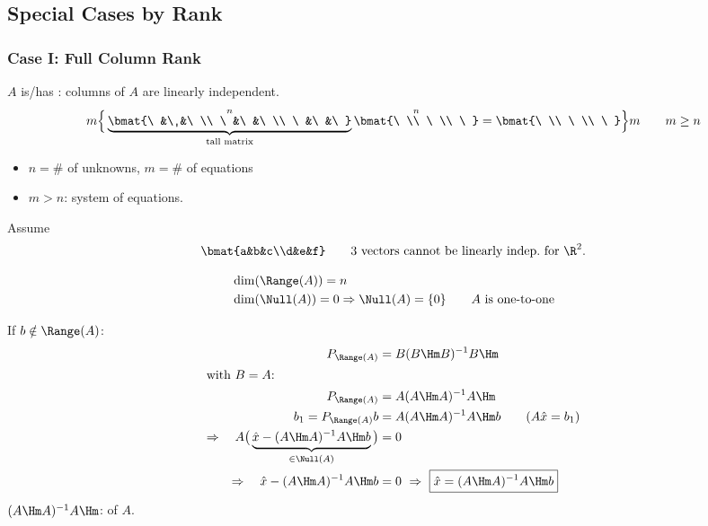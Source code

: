 \subsection{Special Cases by Rank}\label{ss:rank-cases}
\subsubsection{Case I: Full Column Rank}
$A$ is/has : columns of $A$ are linearly independent.
\[
m\Big\{\underbrace{\overset{n}{\bmat{\ &\ &\ \\ \ &\ &\ \\ \ &\ &\ }}}_{\text{tall matrix}}
\overset{n}{\bmat{\ \\ \ \\ \ }}=\bmat{\ \\ \ \\ \ }\Big\}m \qquad m\geq n
\]
\begin{itemize}[nosep,leftmargin=1.5em]
\item $n=\#$ of unknowns, \quad $m=\#$ of equations
\item $m>n$:  system of equations.
\end{itemize}
Assume
\[
\bmat{a&b&c\\d&e&f}\qquad\text{3 vectors cannot be linearly indep.\ for }\R^2.
\]

\begin{align*}
&\dim(\Range(A))=n\\
&\dim(\Null(A))=0\Rightarrow \Null(A)=\{0\} \qquad A\text{ is one-to-one}
\end{align*}

If $b\notin\Range(A)$:
\begin{align*}
P_{\Range(A)}&=B(B\Hm B)^{-1}B\Hm\\
\intertext{with $B=A$:}
P_{\Range(A)}&=A(A\Hm A)^{-1}A\Hm\\
b_1=P_{\Range(A)}b&=A(A\Hm A)^{-1}A\Hm b \qquad (A\hat{x}=b_1)\\
\Rightarrow\quad A\big(\underbrace{\hat{x}-(A\Hm A)^{-1}A\Hm b}_{\in\Null(A)}\big)&=0\\
\Rightarrow\quad \hat{x}-(A\Hm A)^{-1}A\Hm b&=0
\ \Rightarrow\ \boxed{\hat{x}=(A\Hm A)^{-1}A\Hm b}
\end{align*}
$(A\Hm A)^{-1}A\Hm$:  of $A$.


